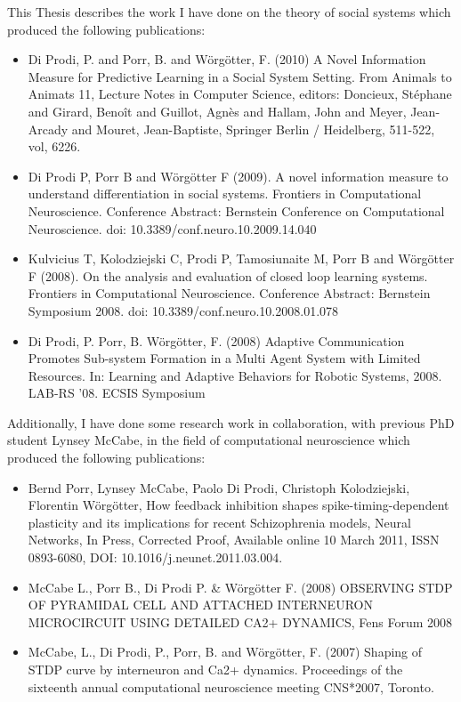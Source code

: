 
This Thesis describes the work I have done on the theory of social systems
which produced the following publications:
\begin{itemize}
\item Di Prodi, P. and Porr, B. and W\"{o}rg\"{o}tter, F. (2010) A Novel Information
Measure for Predictive Learning in a Social System Setting. From Animals to
Animats 11, Lecture Notes in Computer Science, editors: Doncieux, Stéphane and
Girard, Benoît and Guillot, Agnès and Hallam, John and Meyer, Jean-Arcady and
Mouret, Jean-Baptiste, Springer Berlin / Heidelberg, 511-522, vol, 6226.

\item Di Prodi P, Porr B and W\"{o}rg\"{o}tter F (2009). A novel information measure to
understand differentiation in social systems. Frontiers in Computational
Neuroscience. Conference Abstract: Bernstein Conference on Computational
Neuroscience. doi: 10.3389/conf.neuro.10.2009.14.040

\item Kulvicius T, Kolodziejski C, Prodi P, Tamosiunaite M, Porr B and
W\"{o}rg\"{o}tter F (2008). On the analysis and evaluation of closed loop learning
systems. Frontiers in Computational Neuroscience. Conference Abstract: Bernstein
Symposium 2008. doi: 10.3389/conf.neuro.10.2008.01.078

\item Di Prodi, P. Porr, B. W\"{o}rg\"{o}tter, F. (2008) Adaptive Communication
Promotes Sub-system Formation in a Multi Agent System with Limited Resources.
In: Learning and Adaptive Behaviors for Robotic Systems, 2008. LAB-RS '08. ECSIS
Symposium
\end{itemize}

Additionally, I have done some research work in collaboration, with previous PhD
student Lynsey McCabe, in the field of computational neuroscience which produced
the following publications:
\begin{itemize}
\item Bernd Porr, Lynsey McCabe, Paolo Di Prodi, Christoph Kolodziejski,
Florentin W\"{o}rg\"{o}tter, How feedback inhibition shapes spike-timing-dependent
plasticity and its implications for recent Schizophrenia models, Neural
Networks, In Press, Corrected Proof, Available online 10 March 2011, ISSN
0893-6080, DOI: 10.1016/j.neunet.2011.03.004.

\item McCabe L., Porr B., Di Prodi P. \& W\"{o}rg\"{o}tter F. (2008) OBSERVING STDP
OF PYRAMIDAL CELL AND ATTACHED INTERNEURON MICROCIRCUIT USING DETAILED CA2+
DYNAMICS, Fens Forum 2008

\item McCabe, L., Di Prodi, P., Porr, B. and W\"{o}rg\"{o}tter, F. (2007) Shaping of
STDP curve by interneuron and Ca2+ dynamics. Proceedings of the sixteenth annual
computational neuroscience meeting CNS*2007, Toronto.
\end{itemize}

